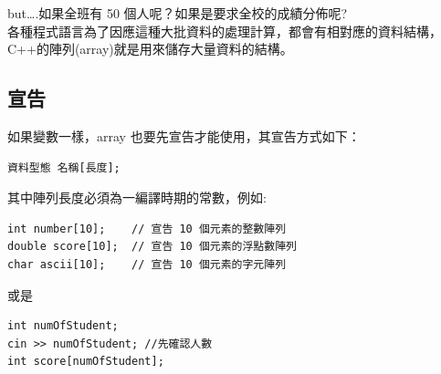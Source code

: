 \documentclass[a4paper,12pt]{article}
\begin{document}
but\ldots{}.如果全班有 50 個人呢？如果是要求全校的成績分佈呢?\\

各種程式語言為了因應這種大批資料的處理計算，都會有相對應的資料結構，C++的陣列(array)就是用來儲存大量資料的結構。\\
\subsection{宣告}
\label{sec:org8ffc899}
如果變數一樣，array 也要先宣告才能使用，其宣告方式如下：\\
\lstset{breaklines=true,language=cpp,label= ,caption= ,captionpos=b,firstnumber=1,numbers=left}
\begin{lstlisting}
資料型態 名稱[長度];
\end{lstlisting}

其中陣列長度必須為一編譯時期的常數，例如:\\
\lstset{breaklines=true,language=cpp,label= ,caption= ,captionpos=b,firstnumber=1,numbers=left}
\begin{lstlisting}
int number[10];    // 宣告 10 個元素的整數陣列
double score[10];  // 宣告 10 個元素的浮點數陣列
char ascii[10];    // 宣告 10 個元素的字元陣列
\end{lstlisting}

或是\\
\lstset{breaklines=true,language=cpp,label= ,caption= ,captionpos=b,firstnumber=1,numbers=left}
\begin{lstlisting}
int numOfStudent;
cin >> numOfStudent; //先確認人數
int score[numOfStudent];
\end{lstlisting}
\end{document}
